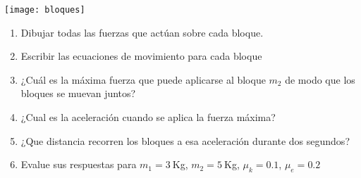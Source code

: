   \begin{minipage}{0.4\linewidth}
    \texttt{[image: bloques]}
  \end{minipage}
  \begin{minipage}{0.6\linewidth}
    \begin{enumerate}
    \item Dibujar todas las fuerzas que actúan sobre cada bloque.
      \label{item:d1a}
    \item Escribir las ecuaciones de movimiento para cada bloque
      \label{item:d1b}
    \item ¿Cuál es la máxima fuerza que puede aplicarse al bloque $m_2$ de modo que los bloques se muevan juntos?
      \label{item:d1c}
    \item ¿Cual es la aceleración cuando se aplica la fuerza máxima?
      \label{item:d1d}
    \item ¿Que distancia recorren los bloques a esa aceleración durante dos segundos?
      \label{item:d1e}
    \item Evalue sus respuestas para $m_1=3\ $Kg, $m_2=5\ $Kg, $\mu_k=0.1$, $\mu_e=0.2$
      \label{item:d1f}
    \end{enumerate}
  \end{minipage}

